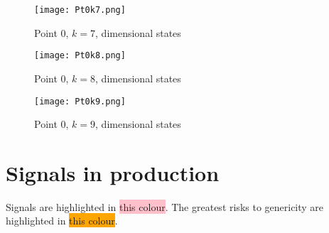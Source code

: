 \documentclass[a4paper,11pt,twoside]{article}
\theoremstyle{definition}
\theoremstyle{remark}
\newcommand{\sh}[1]{\colorbox{pink}{#1}}
\newcommand{\bad}[1]{\colorbox{orange}{#1}}
\begin{document}
\begin{figure}[!h]
  \caption{Point 0, $k=7$, dimensional states}
  \centering
    \texttt{[image: Pt0k7.png]}
    \label{entpt7}
\end{figure}
\newpage 
\begin{figure}[!h]
  \caption{Point 0, $k=8$, dimensional states}
  \centering
    \texttt{[image: Pt0k8.png]}
    \label{entpt8}
\end{figure}
\begin{figure}[!h]
  \caption{Point 0, $k=9$, dimensional states}
  \centering
    \texttt{[image: Pt0k9.png]}
    \label{entpt9}
\end{figure}
\newpage 
\section{Signals in production}
Signals are highlighted in \sh{this colour}. The greatest risks to genericity are highlighted in \bad{this colour}.
\end{document}
